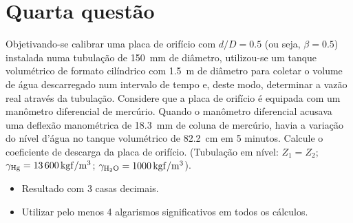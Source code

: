 \documentclass[a4paper, 12pt, brazilian]{article}
\numberwithin{equation}{section}
\begin{document}
	\section{Quarta questão}
	Objetivando-se calibrar uma placa de orifício com $d/D=0.5$ (ou seja, $\beta=0.5$) instalada numa tubulação de \SI{150}{\milli\meter} de diâmetro, utilizou-se um tanque volumétrico de formato cilíndrico com \SI{1.5}{\meter} de diâmetro para coletar o volume de água descarregado num intervalo de tempo e, deste modo, determinar a vazão real através da tubulação. Considere que a placa de orifício é equipada com um manômetro diferencial de mercúrio. Quando o manômetro diferencial acusava uma deflexão manométrica de \SI{18.3}{\milli\meter} de coluna de mercúrio, havia a variação do nível d'água no tanque volumétrico de \SI{82.2}{\centi\meter} em 5 minutos. Calcule o coeficiente de descarga da placa de orifício. (Tubulação em nível: $Z_{1}=Z_{2}$; $\gamma_{\ce{Hg}}=\SI{13600}{\kilogram f/\meter^{3}}$; $\gamma_{\ce{H2O}}=\SI{1000}{\kilogram f/\meter^{3}}$).
	\begin{itemize}
		\item Resultado com 3 casas decimais.
		\item Utilizar pelo menos 4 algarismos significativos em todos os cálculos.
	\end{itemize}
\end{document}
